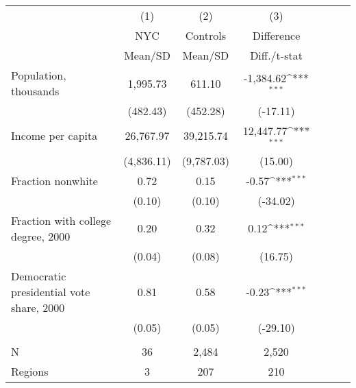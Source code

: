 {\def\sym#1{\ifmmode^{#1}\else\(^{#1}\)\fi} \begin{tabular}{l*{3}{cc}} \hline
                    &\multicolumn{1}{c}{(1)}&\multicolumn{1}{c}{(2)}&\multicolumn{1}{c}{(3)}\\
                    &\multicolumn{1}{c}{NYC}&\multicolumn{1}{c}{Controls}&\multicolumn{1}{c}{Difference}\\
                    &     Mean/SD&     Mean/SD&Diff./t-stat         \\
\hline
Population, thousands&    1,995.73&      611.10&   -1,384.62\sym{***}\\
                    &    (482.43)&    (452.28)&    (-17.11)         \\
Income per capita   &   26,767.97&   39,215.74&   12,447.77\sym{***}\\
                    &  (4,836.11)&  (9,787.03)&     (15.00)         \\
Fraction nonwhite   &        0.72&        0.15&       -0.57\sym{***}\\
                    &      (0.10)&      (0.10)&    (-34.02)         \\
Fraction with college degree, 2000&        0.20&        0.32&        0.12\sym{***}\\
                    &      (0.04)&      (0.08)&     (16.75)         \\
Democratic presidential vote share, 2000&        0.81&        0.58&       -0.23\sym{***}\\
                    &      (0.05)&      (0.05)&    (-29.10)         \\
 & & & \\
N                   &          36&       2,484&       2,520         \\
Regions             &           3&         207&         210         \\
\hline\hline
\end{tabular}
}
